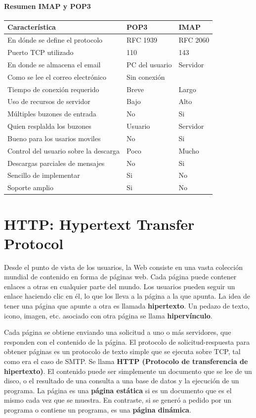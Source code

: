\paragraph{Resumen IMAP y POP3}
\begin{center}
  \begin{tabularx}{0.8\textwidth}{l|l|l}
    \textbf{Característica} & \textbf{POP3} & \textbf{IMAP} \\
    \hline
    En dónde se define el protocolo & RFC 1939 & RFC 2060 \\
    \hline
    Puerto TCP utilizado & 110 & 143 \\
    \hline
    En donde se almacena el email & PC del usuario & Servidor \\
    Como se lee el correo electrónico  & Sin conexión & \\
    Tiempo de conexión requerido & Breve & Largo \\
    \hline
    Uso de recursos de servidor & Bajo & Alto \\
    \hline
    Múltiples buzones de entrada & No & Si \\
    \hline
    Quien resplalda los buzones & Usuario & Servidor \\
    \hline
    Bueno para los usarios moviles & No & Si \\
    \hline
    Control del usuario sobre la descarga & Poco & Mucho \\
    \hline
    Descargas parciales de mensajes & No & Si \\
    Sencillo de implementar & Si & No \\
    \hline
    Soporte amplio & Si & No \\
  \end{tabularx}
\end{center}

\section{HTTP: Hypertext Transfer Protocol}
Desde el punto de vista de los usuarios, la Web consiste en una vasta colección mundial de contenido en forma de páginas web. Cada página puede contener enlaces a otras en cualquier parte del mundo. Los usuarios pueden seguir un enlace haciendo clic en él, lo que los lleva a la página a la que apunta. La idea de tener una página que apunte a otra es llamada \textbf{hipertexto}. Un pedazo de texto, icono, imagen, etc. asociado con otra página se llama \textbf{hipervínculo}.

Cada página se obtiene enviando una solicitud a uno o más servidores, que responden con el contenido de la página. El protocolo de solicitud-respuesta para obtener páginas es un protocolo de texto simple que se ejecuta sobre TCP, tal como era el caso de SMTP. Se llama \textbf{HTTP (Protocolo de transferencia de hipertexto)}. El contenido puede ser simplemente un documento que se lee de un disco, o el resultado de una consulta a una base de datos y la ejecución de un programa. La página es una \textbf{página estática} si es un documento que es el mismo cada vez que se muestra. En contraste, si se generó a pedido por un programa o contiene un programa, es una \textbf{página dinámica}.

